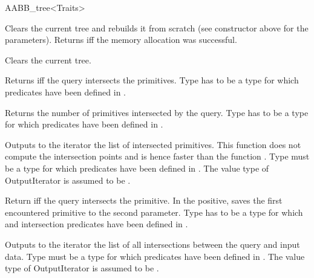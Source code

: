 \begin{ccRefClass}{AABB_tree<Traits>}
\ccOperations

{Clears the current tree and rebuilds it from scratch (see constructor  above for the parameters). Returns  iff the memory allocation was successful. }

{Clears the current tree. }


{ Returns  iff the query intersects the primitives. Type  has to be a type for which  predicates have been defined in .}
	
{Returns the number of primitives intersected by the query. Type  has to be a type for which  predicates have been defined in .}

{Outputs to the iterator the list of intersected primitives. This function does not compute the intersection points and is hence faster than the function . Type  must be a type for which  predicates have been defined in . The value type of OutputIterator is assumed to be .}

	
{Return  iff the query intersects the primitive. In the positive, saves the first encountered primitive to the second parameter. Type  has to be a type for which  and intersection predicates have been defined in .}

	
{Outputs to the iterator the list of all intersections between the query and input data. Type  must be a type for which  predicates have been defined in . The value type of OutputIterator is assumed to be .}


\end{ccRefClass}
